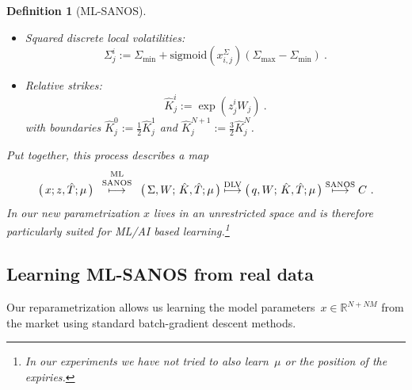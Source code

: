 \documentclass[11pt,a4paper]{article}
\newtheorem{definition}{Definition}[section]
\newcommand{\R}{\mathbb{R}}
\DeclareRobustCommand{\supstack}[2]{\stackrel{\mbox{{\scriptsize ${#1}$}}}{ {#2} }}     %
\begin{document}
\begin{definition}[ML-SANOS]
\begin{itemize}
                        
                        and with them the total volatilities
             \begin{equation}\label{eq:totalW}
             W_j := \sum_{\ell=1}^{j} \sigma_\ell \left( 
             \sqrt{ \hat T_\ell  } - \sqrt{ \hat T_{\ell -1} } \right) \ .                 
             \end{equation}
        \item Squared discrete local volatilities:
              \begin{equation}\label{eq:defDLVdsq}
                 \Sigma^i_j := \Sigma_{\min} + \mathrm{sigmoid}( x^{\Sigma}_{i,j} ) ( \Sigma_{\max} - \Sigma_{\min} )\ .
              \end{equation}
        \item Relative strikes:
              \begin{equation}\label{eq:constructK}
                \hat K^i_j := \exp\left( z^i_j W_j \right)\ .                  
              \end{equation}
              with boundaries $\hat K^0_j:=\frac12 \hat K^1_j$ and $\hat K^{N+1}_j := \frac32 \hat K^N_j$.

    \end{itemize}
    Put together, this process describes a map
    \begin{equation}
        \big(\,x;z,\hat T; \mu\,\big)  \supstack{
            \begin{array}{c}
                \mathrm{ML}\\
                \mathrm{SANOS}
                \end{array}
        }\longmapsto \big(\, \Sigma,W;\,\hat K,\hat T; \mu\, \big) 
        \supstack{\mathrm{DLV}}\longmapsto \big(\,q,W;\,\hat K,\hat T; \mu\, \big)  \supstack{\mathrm{SANOS}}\longmapsto C \ .
    \end{equation}
    In our new parametrization $x$ lives in an unrestricted space and is therefore
    particularly suited for ML/AI based learning.\footnote{
        In our experiments we have not
        tried to also learn~$\mu$ or the position of the expiries.}
\end{definition}

\subsection{Learning ML-SANOS from real data}

Our reparametrization allows us learning the model parameters~$x\in \R^{N+NM}$ from the market
using standard batch-gradient descent methods.
\end{document}
